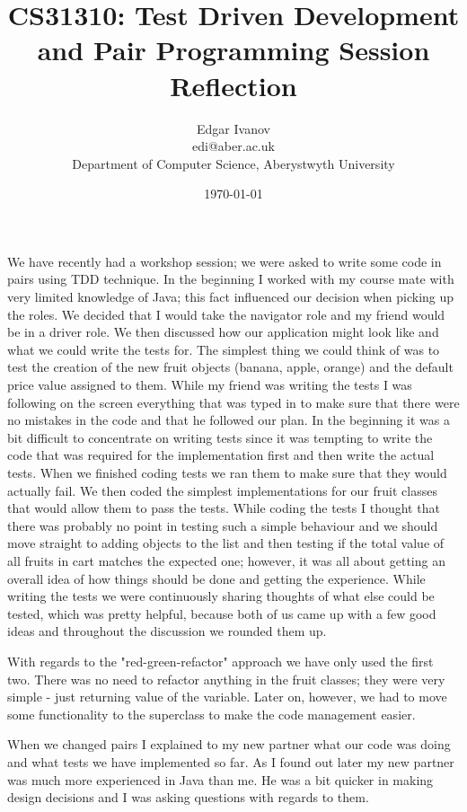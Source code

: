 \documentclass[]{report}
\begin{document}
\title{CS31310: Test Driven Development and Pair Programming Session Reflection}
\author{Edgar Ivanov\\ edi@aber.ac.uk \\ Department of Computer Science, Aberystwyth University}
\date{\today}
\maketitle
We have recently had a workshop session; we were asked to write some code in pairs using TDD technique. In the beginning I worked with my course mate with very limited knowledge of Java; this fact influenced our decision when picking up the roles. We decided that I would take the navigator role and my friend would be in a driver role. We then discussed how our application might look like and what we could write the tests for. The simplest thing we could think of was to test the creation of the new fruit objects (banana, apple, orange) and the default price value assigned to them. While my friend was writing the tests I was following on the screen everything that was typed in to make sure that there were no mistakes in the code and that he followed our plan.  In the beginning it was a bit difficult to concentrate on writing tests since it was tempting to write the code that was required for the implementation first and then write the actual tests. When we finished coding tests we ran them to make sure that they would actually fail. We then coded the simplest implementations for our fruit classes that would allow them to pass the tests. While coding the tests I thought that there was probably no point in testing such a simple behaviour and we should move straight to adding objects to the list and then testing if the total value of all fruits in cart matches the expected one; however, it was all about getting an overall idea of how things should be done and getting the experience. While writing the tests we were continuously sharing thoughts of what else could be tested, which was pretty helpful, because both of us came up with a few good ideas and throughout the discussion we rounded them up. 


With regards to the "red-green-refactor" approach we have only used the first two. There was no need to refactor anything in the fruit classes; they were very simple - just returning value of the variable. Later on, however, we had to move some functionality to the superclass to make the code management easier. 


When we changed pairs I explained to my new partner what our code was doing and what tests we have implemented so far. As I found out later my new partner was much more experienced in Java than me. He was a bit quicker in making design decisions and I was asking questions with regards to them. 
\end{document}
